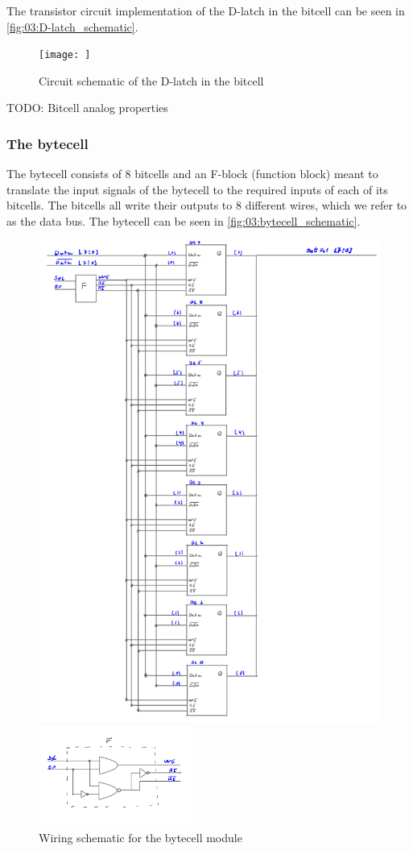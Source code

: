 The transistor circuit implementation of the D-latch in the bitcell can be seen in \autoref{fig:03:D-latch_schematic}.

\begin{figure}
    \centering
    \texttt{[image: ]}
    \caption{Circuit schematic of the D-latch in the bitcell}
    \label{fig:03:D-latch_schematic}
\end{figure}

TODO: Bitcell analog properties

\subsubsection{The bytecell}
The bytecell consists of 8 bitcells and an F-block (function block) meant to translate the input signals of the bytecell to the required inputs of each of its bitcells. The bitcells all write their outputs to 8 different wires, which we refer to as the data bus. The bytecell can be seen in \autoref{fig:03:bytecell_schematic}.

\begin{figure}
    \centering
    \begin{subfigure*}
        \includegraphics[width=0.45\linewidth]{LaTeX_2/Figures/bytecell.png}
    \end{subfigure*}
    \begin{subfigure*}
        \includegraphics[width=0.45\textwidth]{LaTeX_2/Figures/f_blokk.png}
    \end{subfigure*}
    \caption{Wiring schematic for the bytecell module}
    \label{fig:03:bytecell_schematic}
\end{figure}

